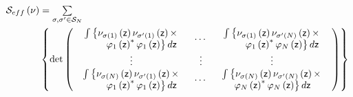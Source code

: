 \documentclass[aps,preprint]{revtex4}%
\begin{document}
\begin{align}
\mathcal{S}_{eff}\left(  \nu\right)   &  =%
{\textstyle\sum\limits_{\sigma,\sigma^{\prime}\in\mathcal{S}_{N}}}
\nonumber\\
&  \left\{  \det\left(
\begin{array}
[c]{ccc}%
\begin{array}
[c]{c}%
\int\left\{  \nu_{\sigma\left(  1\right)  }\left(  \mathsf{z}\right)
\nu_{\sigma^{\prime}\left(  1\right)  }\left(  \mathsf{z}\right)
\times\right.  \\
\qquad\left.  \varphi_{1}\left(  \mathsf{z}\right)  ^{\ast}\varphi_{1}\left(
\mathsf{z}\right)  \right\}  d\mathsf{z}%
\end{array}
& \cdots &
\begin{array}
[c]{c}%
\int\left\{  \nu_{\sigma\left(  1\right)  }\left(  \mathsf{z}\right)
\nu_{\sigma^{\prime}\left(  N\right)  }\left(  \mathsf{z}\right)
\times\right.  \\
\qquad\left.  \varphi_{1}\left(  \mathsf{z}\right)  ^{\ast}\varphi_{N}\left(
\mathsf{z}\right)  \right\}  d\mathsf{z}%
\end{array}
\\
\vdots & \vdots & \vdots\\%
\begin{array}
[c]{c}%
\int\left\{  \nu_{\sigma\left(  N\right)  }\left(  \mathsf{z}\right)
\nu_{\sigma^{\prime}\left(  1\right)  }\left(  \mathsf{z}\right)
\times\right.  \\
\qquad\left.  \varphi_{1}\left(  \mathsf{z}\right)  ^{\ast}\varphi_{1}\left(
\mathsf{z}\right)  \right\}  d\mathsf{z}%
\end{array}
& \cdots &
\begin{array}
[c]{c}%
\int\left\{  \nu_{\sigma\left(  N\right)  }\left(  \mathsf{z}\right)
\nu_{\sigma^{\prime}\left(  N\right)  }\left(  \mathsf{z}\right)
\times\right.  \\
\left.  \varphi_{N}\left(  \mathsf{z}\right)  ^{\ast}\varphi_{N}\left(
\mathsf{z}\right)  \right\}  d\mathsf{z}%
\end{array}
\end{array}
\right)  \right\}
\end{align}
\end{document}
